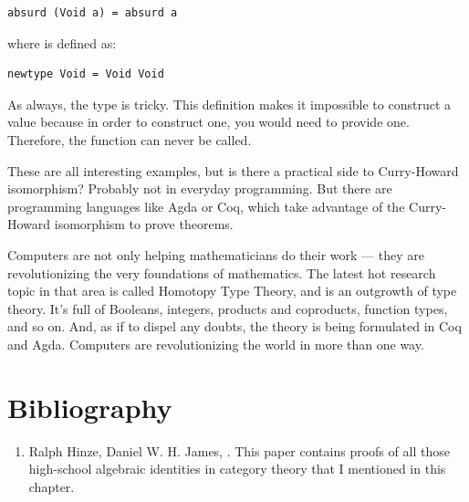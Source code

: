 \begin{Verbatim}
absurd (Void a) = absurd a
\end{Verbatim}
where  is defined as:

\begin{Verbatim}
newtype Void = Void Void
\end{Verbatim}
As always, the type  is tricky. This definition makes it
impossible to construct a value because in order to construct one, you
would need to provide one. Therefore, the function  can
never be called.

These are all interesting examples, but is there a practical side to
Curry-Howard isomorphism? Probably not in everyday programming. But
there are programming languages like Agda or Coq, which take advantage
of the Curry-Howard isomorphism to prove theorems.

Computers are not only helping mathematicians do their work --- they are
revolutionizing the very foundations of mathematics. The latest hot
research topic in that area is called Homotopy Type Theory, and is an
outgrowth of type theory. It's full of Booleans, integers, products and
coproducts, function types, and so on. And, as if to dispel any doubts,
the theory is being formulated in Coq and Agda. Computers are
revolutionizing the world in more than one way.

\section{Bibliography}

\begin{enumerate}
\tightlist
\item
  Ralph Hinze, Daniel W. H. James,
  . This paper contains proofs of all those high-school
  algebraic identities in category theory that I mentioned in this
  chapter.
\end{enumerate}
